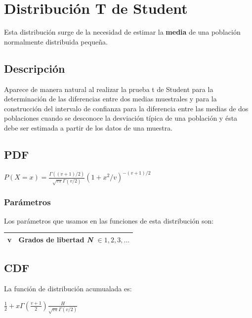 \chapter{Distribución T de Student}

Esta distribución surge de la necesidad de estimar la \textbf{media} de una población normalmente distribuida pequeña. \cite{wiki:1}

\section{Descripción}

Aparece de manera natural al realizar la prueba t de Student para la determinación de las diferencias entre dos medias muestrales y para la construcción del intervalo de confianza para la diferencia entre las medias de dos poblaciones cuando se desconoce la desviación típica de una población y ésta debe ser estimada a partir de los datos de una muestra.


\section{PDF}
\begin{center}
	$P(X=\textit{x}) = \frac{\Gamma((v + 1) / 2)} {\sqrt{v\pi} \Gamma (v/2)} (1 + x^2 / v)^{-(v+1)/2} $
\end{center}

\subsection{Parámetros}
Los parámetros que usamos en las funciones de esta distribución son:

\begin{center}
	\begin{tabular} {| l | l |}
		\hline
		v & Grados de libertad \textit{N} $\in 1, 2, 3, ...$\\ \hline
	\end{tabular}
\end{center}

\section{CDF}
La función de distribución acumualada es:

\begin{center}
$\frac{1}{2} + x\Gamma(\frac{v+1}{2}) \frac{H}{\sqrt{v\pi} \Gamma (v/2)}$
\end{center}

